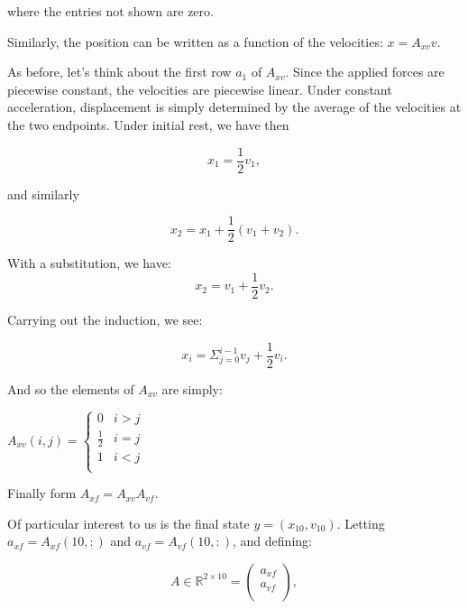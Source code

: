 \documentclass[12pt]{article}
\begin{document}
where the entries not shown are zero. 

\bigbreak

\noindent Similarly, the position can be written as a function of the velocities: $x = A_{xv} v$.

\bigbreak

\noindent As before, let's think about the first row $a_1$ of $A_{xv}$. 
Since the applied forces are piecewise constant, the velocities are piecewise linear. 
Under constant acceleration, displacement is simply determined by the average of the velocities at the two endpoints. 
Under initial rest, we have then 

\begin{equation}
x_1 = \frac{1}{2} v_1,
\end{equation}

and similarly

\begin{equation}
x_2 = x_1 + \frac{1}{2} (v_1 + v_2). 
\end{equation}

With a substitution, we have:
\begin{equation}
x_2 = v_1 + \frac{1}{2} v_2. 
\end{equation}

Carrying out the induction, we see:

\begin{equation}
x_i = \Sigma_{j=0}^{i - 1} v_j + \frac{1}{2} v_i.
\end{equation}

\bigbreak

And so the elements of $A_{xv}$ are simply: 

\bigbreak

$
A_{xv}(i, j) = 
\left\{
\begin{array}{ll}
      0 & i > j \\
      \frac{1}{2} & i = j \\
      1 & i < j \\
\end{array} 
\right.
$

\bigbreak

\noindent Finally form $A_{xf} = A_{xv} A_{vf}$.

Of particular interest to us is the final state 
$y = (x_{10}, v_{10})$. Letting 
$a_{xf} = A_{xf}(10, :)$ and 
$a_{vf} = A_{vf}(10, :)$, and defining:

\begin{equation}
	A \in \mathbb{R} ^ {2 \times 10} = 
	\begin{pmatrix}
	    a_{xf} \\[2pt]
	    a_{vf} \\[2pt]
	\end{pmatrix},
\end{equation}
\end{document}
